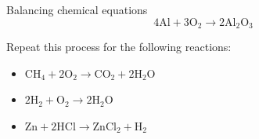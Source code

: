 \begin{activity}{Balancing chemical equations}
    \begin{equation}
    4\mathrm{Al}+3{\mathrm{O}}_{2}\to 2{\mathrm{Al}}_{2}{\mathrm{O}}_{3}\tag{13.5}
      \end{equation}
\par 
\label{m38726*id570943}Repeat this process for the following reactions:
\label{m38726*id08342}\begin{itemize}[noitemsep]
            \item 
${\mathrm{CH}}_{4}+2{\mathrm{O}}_{2}\to {\mathrm{CO}}_{2}+2{\mathrm{H}}_{2}\mathrm{O}$
\item 
$2{\mathrm{H}}_{2}+{\mathrm{O}}_{2}\to 2{\mathrm{H}}_{2}\mathrm{O}$
\item 
$\mathrm{Zn}+2\mathrm{HCl}\to {\mathrm{ZnCl}}_{2}+{\mathrm{H}}_{2}$
\end{itemize}
\end{activity}
\par \label{m38726*uid10}
